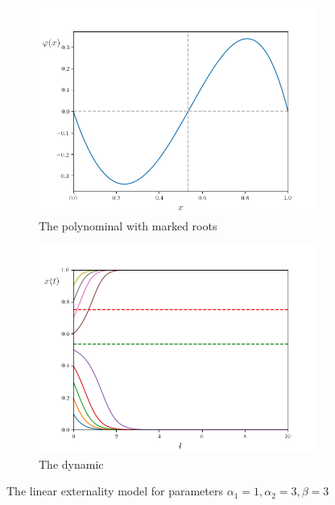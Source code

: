 \documentclass[11pt]{article}
\begin{document}
\begin{figure}[h]
        \centering
        \begin{subfigure}{.5\textwidth}
        \centering
        \includegraphics[scale=0.5]{polynominallinearmodel.png}
        \caption{The polynominal with marked roots} 
        \end{subfigure}%
        \begin{subfigure}{.5\textwidth}
        \centering
        \includegraphics[scale=0.5]{dynamiclinearmodel.png}
        \caption{The dynamic} 
        \label{fig:dynamiclinear}
        \end{subfigure}%
        \caption{The linear externality model for parameters $\alpha_1=1,\alpha_2=3,
        \beta=3$}
        \label{fig:plotmodellinear}
\end{figure}
\end{document}
